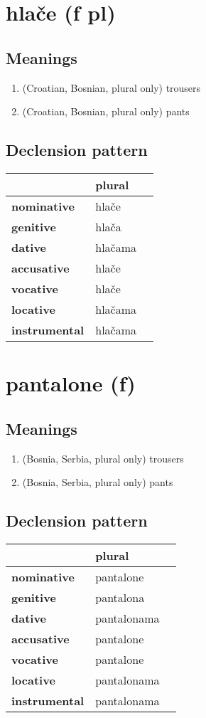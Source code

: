 \filbreak
\section{hlače (f pl)}
\subsection*{Meanings}
\begin{enumerate}
\item (Croatian, Bosnian, plural only) trousers
\item (Croatian, Bosnian, plural only) pants
\end{enumerate}
\subsection*{Declension pattern}
\begin{tabularx}{\linewidth}{Xll}
\toprule
{} &   plural \\
\midrule
\textbf{nominative  } &    hlače \\
\textbf{genitive    } &    hlača \\
\textbf{dative      } &  hlačama \\
\textbf{accusative  } &    hlače \\
\textbf{vocative    } &    hlače \\
\textbf{locative    } &  hlačama \\
\textbf{instrumental} &  hlačama \\
\bottomrule
\end{tabularx}

\filbreak
\section{pantalone (f)}
\subsection*{Meanings}
\begin{enumerate}
\item (Bosnia, Serbia, plural only) trousers
\item (Bosnia, Serbia, plural only) pants
\end{enumerate}
\subsection*{Declension pattern}
\begin{tabularx}{\linewidth}{Xll}
\toprule
{} &       plural \\
\midrule
\textbf{nominative  } &    pantalone \\
\textbf{genitive    } &    pantalona \\
\textbf{dative      } &  pantalonama \\
\textbf{accusative  } &    pantalone \\
\textbf{vocative    } &    pantalone \\
\textbf{locative    } &  pantalonama \\
\textbf{instrumental} &  pantalonama \\
\bottomrule
\end{tabularx}

